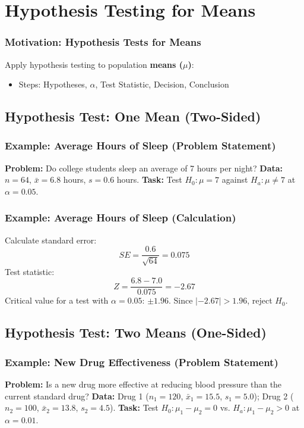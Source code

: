 \documentclass[handout]{beamer}
\begin{document}
\section{Hypothesis Testing for Means}



\begin{frame}
\frametitle{Motivation: Hypothesis Tests for Means}
Apply hypothesis testing to population \textbf{means ($\mu$)}:
\begin{itemize}
\item Steps: Hypotheses, $\alpha$, Test Statistic, Decision, Conclusion
\end{itemize}
\end{frame}

\subsection{Hypothesis Test: One Mean (Two-Sided)}

\begin{frame}
\frametitle{Example: Average Hours of Sleep (Problem Statement)}
\textbf{Problem:} Do college students sleep an average of 7 hours per night? \newline
\textbf{Data:} $n=64$, $\bar{x}=6.8$ hours, $s=0.6$ hours. \newline
\textbf{Task:} Test $H_0: \mu = 7$ against $H_a: \mu \neq 7$ at $\alpha=0.05$.
\end{frame}

\begin{frame}
\frametitle{Example: Average Hours of Sleep (Calculation)}
Calculate standard error:
\[ SE = \frac{0.6}{\sqrt{64}} = 0.075 \]
Test statistic:
\[ Z = \frac{6.8-7.0}{0.075} = -2.67 \]
Critical value for a test with $\alpha=0.05$: $\pm1.96$.\newline
Since $|-2.67| > 1.96$, reject $H_0$.
\end{frame}

\subsection{Hypothesis Test: Two Means (One-Sided)}

\begin{frame}
\frametitle{Example: New Drug Effectiveness (Problem Statement)}
\textbf{Problem:} Is a new drug more effective at reducing blood pressure than the current standard drug? \newline
\textbf{Data:} Drug 1 ($n_1=120$, $\bar{x}_1=15.5$, $s_1=5.0$); Drug 2 ($n_2=100$, $\bar{x}_2=13.8$, $s_2=4.5$). \newline
\textbf{Task:} Test $H_0: \mu_1 - \mu_2 = 0$ vs. $H_a: \mu_1 - \mu_2 > 0$ at $\alpha=0.01$.
\end{frame}
\end{document}
